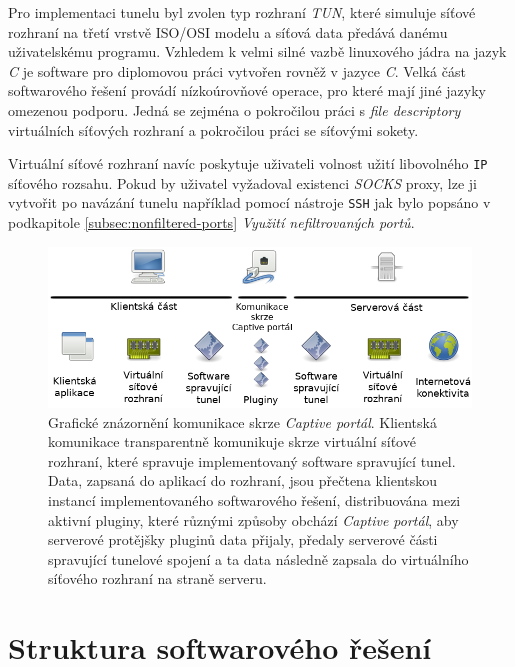 \documentclass[thesis=M,czech]{FITthesis}[2012/10/20]
\begin{document}
Pro implementaci tunelu byl zvolen typ rozhraní \textit{TUN}, které simuluje síťové rozhraní na třetí vrstvě ISO/OSI modelu a síťová data předává danému uživatelskému programu. Vzhledem k velmi silné vazbě linuxového jádra na jazyk \textit{C} je software pro diplomovou práci vytvořen rovněž v jazyce \textit{C}. Velká část softwarového řešení provádí nízkoúrovňové operace, pro které mají jiné jazyky omezenou podporu. Jedná se zejména o pokročilou práci s \textit{file descriptory} virtuálních síťových rozhraní a pokročilou práci se síťovými sokety.

Virtuální síťové rozhraní navíc poskytuje uživateli volnost užití libovolného \texttt{IP} síťového rozsahu. Pokud by uživatel vyžadoval existenci \textit{SOCKS} proxy, lze ji vytvořit po navázání tunelu například pomocí nástroje \texttt{SSH} jak bylo popsáno v podkapitole \ref{subsec:nonfiltered-ports} \textit{Využití nefiltrovaných portů}.


  \begin{figure}
  \centering
    \includegraphics[width=\textwidth]{attachments/communication_schema.png}
    \caption{Grafické znázornění komunikace skrze \textit{Captive portál}. Klientská komunikace transparentně komunikuje skrze virtuální síťové rozhraní, které spravuje implementovaný software spravující tunel. Data, zapsaná do aplikací do rozhraní, jsou přečtena klientskou instancí implementovaného softwarového řešení, distribuována mezi aktivní pluginy, které různými způsoby obchází \textit{Captive portál}, aby serverové protějšky pluginů data přijaly, předaly serverové části spravující tunelové spojení a ta data následně zapsala do virtuálního síťového rozhraní na straně serveru.}
    \label{pic:comm-schema}
  \end{figure}

\section{Struktura softwarového řešení}
\label{subsec:struktura-sw}
\end{document}
